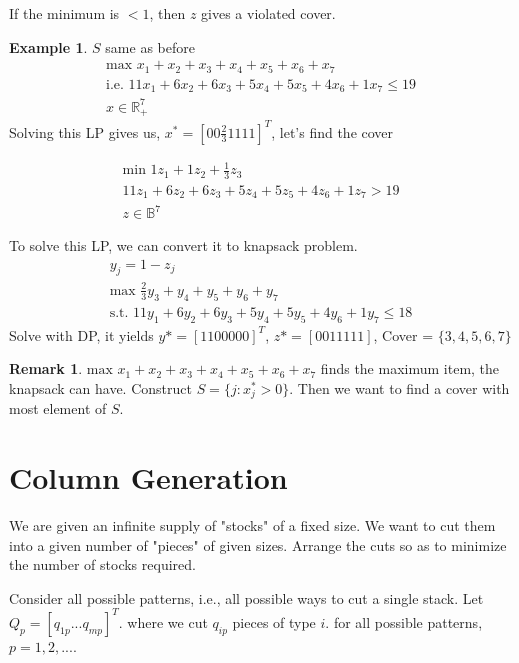 \documentclass{article}
\theoremstyle{plain}
\theoremstyle{definition}
\newtheorem{eg}{Example}
\newtheorem{rmk}{Remark}
\begin{document}
If the minimum is $<1$, then $z$ gives a violated cover.

\begin{eg}
    $S$ same as before
    \begin{gather*}
        \text{max } x_1 + x_2 + x_3 + x_4 + x_5 + x_6 + x_7\\
        \text{i.e. } 11x_1 + 6x_2 + 6x_3 + 5x_4 + 5x_5 + 4x_6 + 1x_7 \leq 19\\
        x\in\mathbb{R}_+^7
    \end{gather*}
    Solving this LP gives us, $x^* = [0 0 \frac{2}{3} 1  1 1 1]^T$, let's find the cover

    \begin{gather*}
        \text{min } 1z_1  + 1z_2 + \frac{1}{3}z_3\\
        11z_1 + 6z_2 + 6z_3 + 5z_4 + 5z_5 + 4z_6 + 1z_7 > 19\\
        z\in\mathbb{B}^7
    \end{gather*}

    To solve this LP, we can convert it to knapsack problem.
    \begin{gather*}
        y_j = 1 - z_j\\
        \text{max } \frac{2}{3}y_3 + y_4 + y_5 + y_6 + y_7\\
        \text{s.t. } 11y_1 + 6y_2 + 6y_3 + 5y_4 + 5y_5 + 4y_6 + 1y_7 \leq 18
    \end{gather*}
    Solve with DP, it yields $y* =[ 1 1 0 0 0 0 0]^T$, $z* = [0 0 1 1 1 1 1]$,
    Cover = $\{3, 4, 5, 6, 7\}$
\end{eg}

\begin{rmk}
    $\text{max } x_1 + x_2 + x_3 + x_4 + x_5 + x_6 + x_7$ finds the maximum item,
    the knapsack can have. Construct $S = \{j: x^*_j > 0\}$.
    Then we want to find a cover with most element of $S$.
\end{rmk}

\section{Column Generation}
We are given an infinite supply of "stocks" of a fixed size. We want to cut them into
a given number of "pieces" of given sizes. Arrange the cuts so as to minimize the number
of stocks required.

Consider all possible patterns, i.e., all possible ways to cut a single stack. Let
$Q_p = [q_{1p} ... q_{mp}]^T$. where we cut $q_{ip}$ pieces of type $i$. for all
possible patterns, $p=1,2,...$.
\end{document}
